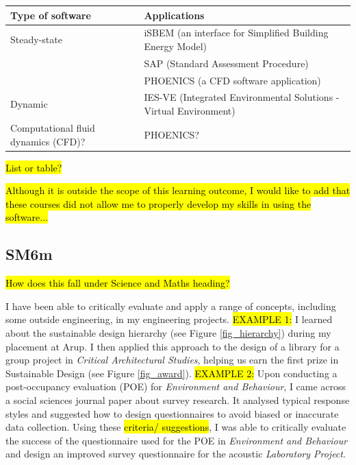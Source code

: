 \begin{table}[htbp]
\begin{tabular}{@{}lp{8cm}@{}}
\toprule
Type of software & Applications \\ \midrule
Steady-state & iSBEM (an interface for Simplified Building Energy Model) \\
 & SAP (Standard Assessment Procedure) \\
 & PHOENICS (a CFD software application) \\
Dynamic & IES-VE (Integrated Environmental Solutions - Virtual Environment) \\
Computational fluid dynamics (CFD)? & PHOENICS? \\ \bottomrule
\end{tabular}
\end{table}

\hl{List or table?}

\hl{Although it is outside the scope of this learning outcome, I would like to add that these courses did not allow me to properly develop my skills in using the software...}


\subsection*{SM6m}

\hl{How does this fall under Science and Maths heading?}

I have been able to critically evaluate and apply a range of concepts, including some outside engineering, in my engineering projects.
\hl{EXAMPLE 1:}
I learned about the sustainable design hierarchy (see Figure \ref{fig_hierarchy}) during my placement at Arup.
I then applied this approach to the design of a library for a group project in \textit{Critical Architectural Studies}, helping us earn the first prize in Sustainable Design (see Figure \ref{fig_award}).
\hl{EXAMPLE 2:}
Upon conducting a post-occupancy evaluation (POE) for \textit{Environment and Behaviour}, I came across a social sciences journal paper about survey research.
It analysed typical response styles and suggested how to design questionnaires to avoid biased or inaccurate data collection.
Using these \hl{criteria/ suggestions}, I was able to critically evaluate the success of the questionnaire used for the POE in \textit{Environment and Behaviour} and design an improved survey questionnaire for the acoustic \textit{Laboratory Project}.

